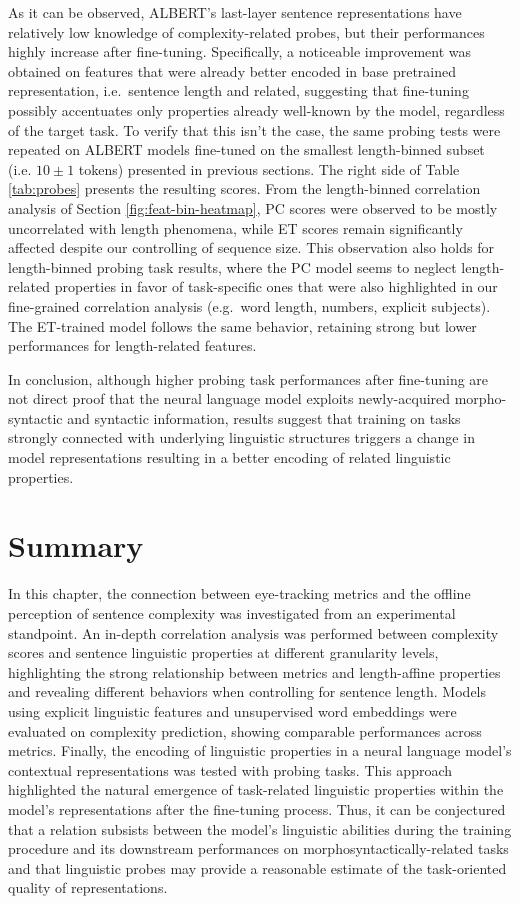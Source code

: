 \documentclass[a4paper, nobind]{templates/ociamthesis}
\begin{document}
As it can be observed, ALBERT's last-layer sentence representations have relatively low knowledge of complexity-related probes, but their performances highly increase after fine-tuning. Specifically, a noticeable improvement was obtained on features that were already better encoded in base pretrained representation, i.e.~sentence length and related, suggesting that fine-tuning possibly accentuates only properties already well-known by the model, regardless of the target task. To verify that this isn't the case, the same probing tests were repeated on ALBERT models fine-tuned on the smallest length-binned subset (i.e. \(10\pm1\) tokens) presented in previous sections. The right side of Table \ref{tab:probes} presents the resulting scores. From the length-binned correlation analysis of Section \ref{fig:feat-bin-heatmap}, PC scores were observed to be mostly uncorrelated with length phenomena, while ET scores remain significantly affected despite our controlling of sequence size. This observation also holds for length-binned probing task results, where the PC model seems to neglect length-related properties in favor of task-specific ones that were also highlighted in our fine-grained correlation analysis (e.g.~word length, numbers, explicit subjects). The ET-trained model follows the same behavior, retaining strong but lower performances for length-related features.

In conclusion, although higher probing task performances after fine-tuning are not direct proof that the neural language model exploits newly-acquired morpho-syntactic and syntactic information, results suggest that training on tasks strongly connected with underlying linguistic structures triggers a change in model representations resulting in a better encoding of related linguistic properties.

\hypertarget{subchap:ex1-summary}{%
\section{Summary}\label{subchap:ex1-summary}}

In this chapter, the connection between eye-tracking metrics and the offline perception of sentence complexity was investigated from an experimental standpoint. An in-depth correlation analysis was performed between complexity scores and sentence linguistic properties at different granularity levels, highlighting the strong relationship between metrics and length-affine properties and revealing different behaviors when controlling for sentence length. Models using explicit linguistic features and unsupervised word embeddings were evaluated on complexity prediction, showing comparable performances across metrics. Finally, the encoding of linguistic properties in a neural language model's contextual representations was tested with probing tasks. This approach highlighted the natural emergence of task-related linguistic properties within the model's representations after the fine-tuning process. Thus, it can be conjectured that a relation subsists between the model's linguistic abilities during the training procedure and its downstream performances on morphosyntactically-related tasks and that linguistic probes may provide a reasonable estimate of the task-oriented quality of representations.
\end{document}
